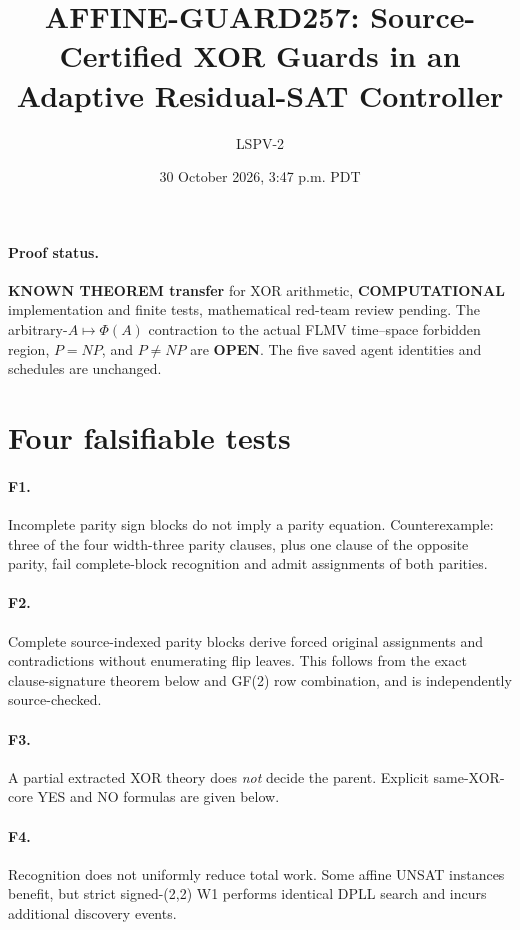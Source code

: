 \documentclass[11pt]{article}
\title{AFFINE-GUARD257: Source-Certified XOR Guards in an Adaptive Residual-SAT Controller}
\author{LSPV-2}
\date{30 October 2026, 3:47 p.m. PDT}
\begin{document}
\maketitle
\paragraph{Proof status.} \textbf{KNOWN THEOREM transfer} for XOR arithmetic, \textbf{COMPUTATIONAL} implementation and finite tests, mathematical red-team review pending. The arbitrary-$A\mapsto\Phi(A)$ contraction to the actual FLMV time--space forbidden region, $P=NP$, and $P\ne NP$ are \textbf{OPEN}. The five saved agent identities and schedules are unchanged.

\section{Four falsifiable tests}
\paragraph{F1.} Incomplete parity sign blocks do not imply a parity equation. Counterexample: three of the four width-three parity clauses, plus one clause of the opposite parity, fail complete-block recognition and admit assignments of both parities.
\paragraph{F2.} Complete source-indexed parity blocks derive forced original assignments and contradictions without enumerating flip leaves. This follows from the exact clause-signature theorem below and GF(2) row combination, and is independently source-checked.
\paragraph{F3.} A partial extracted XOR theory does \emph{not} decide the parent. Explicit same-XOR-core YES and NO formulas are given below.
\paragraph{F4.} Recognition does not uniformly reduce total work. Some affine UNSAT instances benefit, but strict signed-(2,2) W1 performs identical DPLL search and incurs additional discovery events.
\end{document}
